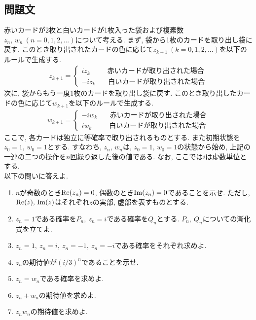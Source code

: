 \documentclass[dvipdfmx,titlepage, 11pt, a4paper]{jsarticle}%
\begin{document}
\subsection{問題文}
赤いカードが2枚と白いカードが1枚入った袋および複素数$z_{n},\,w_{n}\ (n=0,1,2,...)$について考える. まず, 袋から1枚のカードを取り出し袋に戻す. このとき取り出されたカードの色に応じて$z_{k+1}\ (k=0,1,2,...)$を以下のルールで生成する.
\begin{eqnarray*}
	z_{k+1}=\left\{\begin{array}{l}iz_{k}\hspace{30pt} 赤いカードが取り出された場合\\-iz_{k}\hspace{22pt} 白いカードが取り出された場合\end{array}\right.
\end{eqnarray*}
次に, 袋からもう一度1枚のカードを取り出し袋に戻す. このとき取り出したカードの色に応じて$w_{k+1}$を以下のルールで生成する.
\begin{eqnarray*}
	w_{k+1}=\left\{\begin{array}{l}-iw_{k}\hspace{22pt} 赤いカードが取り出された場合\\iw_{k}\hspace{30pt} 白いカードが取り出された場合\end{array}\right.
\end{eqnarray*}
ここで, 各カードは独立に等確率で取り出されるものとする. また初期状態を$z_{0}=1,\,w_{0}=1$とする. すなわち, $z_{n},\,w_{n}$は, $z_{0}=1,\,w_{0}=1$の状態から始め, 上記の一連の二つの操作を$n$回繰り返した後の値である. なお, ここでは$i$は虚数単位とする.\\[0.5cm]
\hspace{10pt} 以下の問いに答えよ.

\begin{enumerate}[(1)]
	\setlength{\itemindent}{10pt}
	      \setlength{\itemsep}{10pt}
	\item $n$が奇数のとき${\rm Re}(z_{n})=0$, 偶数のとき${\rm Im}(z_{n})=0$であることを示せ. ただし, ${\rm Re}(z),\,{\rm Im}(z)$はそれぞれ$z$の実部, 虚部を表すものとする.
	\item $z_{n}=1$である確率を$P_{n},\ z_{n}=i$である確率を$Q_{n}$とする. $P_{n},\ Q_{n}$についての漸化式を立てよ.
	\item $z_{n}=1,\ z_{n}=i,\ z_{n}=-1,\ z_{n}=-i$である確率をそれぞれ求めよ.
	\item $z_{n}$の期待値が$(i/3)^{n}$であることを示せ.
	\item $z_{n}=w_{n}$である確率を求めよ.
	\item $z_{n}+w_{n}$の期待値を求めよ.
	\item $z_{n}w_{n}$の期待値を求めよ.
\end{enumerate}
\newpage
\end{document}
